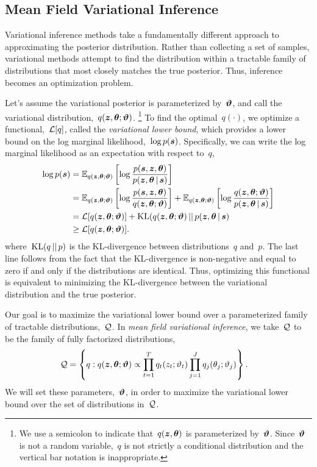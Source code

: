 \subsection{Mean Field Variational Inference}
Variational inference methods \cite{jordan1999introduction,
  wainwright2008graphical} take a fundamentally different approach to
approximating the posterior distribution. Rather than collecting a set
of samples, variational methods attempt to find the distribution
within a tractable family of distributions that most closely matches
the true posterior. Thus, inference becomes an optimization problem.

Let's assume the variational posterior is parameterized by~$\boldsymbol{\vartheta}$,
and call the variational distribution,~$q(\boldsymbol{z}, \boldsymbol{\theta} ; \boldsymbol{\vartheta})$.
\footnote{We use a semicolon to indicate that~$q(\boldsymbol{z}, \boldsymbol{\theta})$ is
  parameterized by~$\boldsymbol{\vartheta}$.  Since~$\boldsymbol{\vartheta}$ is not a random
  variable,~$q$ is not strictly a conditional distribution and the
  vertical bar notation is inappropriate.}  To find the
optimal~$q(\cdot)$, we optimize a functional,~$\mathcal{L}[q]$, called the
\emph{variational lower bound}, which provides a lower bound on the
log marginal likelihood,~${\log p(\boldsymbol{s})}$.  Specifically, we can write
the log marginal likelihood as an expectation with respect to~$q$,
\begin{align*}
  \log p(\boldsymbol{s}) 
  &= \mathbb{E}_{q(\boldsymbol{z}, \boldsymbol{\theta} ; \boldsymbol{\vartheta})} \left[ \log \frac{p(\boldsymbol{s}, \boldsymbol{z}, \boldsymbol{\theta})}{p(\boldsymbol{z}, \boldsymbol{\theta} \,|\, \boldsymbol{s})} \right] \\
  &= \mathbb{E}_{q(\boldsymbol{z}, \boldsymbol{\theta} ; \boldsymbol{\vartheta})} \left[ \log \frac{p(\boldsymbol{s}, \boldsymbol{z}, \boldsymbol{\theta})}{q(\boldsymbol{z}, \boldsymbol{\theta}; \boldsymbol{\vartheta})} \right]
   + \mathbb{E}_{q(\boldsymbol{z}, \boldsymbol{\theta}; \boldsymbol{\vartheta})} \left[ \log \frac{q(\boldsymbol{z}, \boldsymbol{\theta}; \boldsymbol{\vartheta})}{p(\boldsymbol{z}, \boldsymbol{\theta} \,|\, \boldsymbol{s})} \right] \\
  &= \mathcal{L}[q(\boldsymbol{z}, \boldsymbol{\theta}; \boldsymbol{\vartheta})] + \mathrm{KL}(q(\boldsymbol{z}, \boldsymbol{\theta}; \boldsymbol{\vartheta}) {\,||\,} p(\boldsymbol{z}, \boldsymbol{\theta} \,|\, \boldsymbol{s}) \\
  &\geq \mathcal{L}[q(\boldsymbol{z}, \boldsymbol{\theta}; \boldsymbol{\vartheta})].
\end{align*}
where~$\mathrm{KL}(q {\,||\,} p)$ is the KL-divergence between distributions~$q$ and~$p$. 
The last line follows from the fact that the KL-divergence is non-negative
and equal to zero if and only if the distributions are identical. Thus, 
optimizing this functional is equivalent to minimizing the KL-divergence
between the variational distribution and the true posterior.

Our goal is to maximize the variational lower bound over a
parameterized family of tractable distributions,~$\mathcal{Q}$. In \emph{mean field
variational inference}, we take~$\mathcal{Q}$ to be the family of fully
factorized distributions,
\begin{align*}
  \mathcal{Q} &= \left \{ q: q(\boldsymbol{z}, \boldsymbol{\theta}; \boldsymbol{\vartheta}) \propto \prod_{t=1}^T q_t(z_t; \vartheta_t) \prod_{j=1}^J q_j(\theta_j; \vartheta_j) \right\}.
\end{align*}
We will set these parameters,~$\boldsymbol{\vartheta}$, in order to maximize the
variational lower bound over the set of distributions in~$\mathcal{Q}$.

